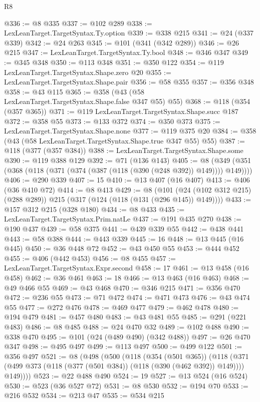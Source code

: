 \begin{lexlean}{R8}
\begin{coremodule}
{{{{{{{{{{{{{{{{{{{{{{{{{{{{{{{{{{{{{{{{{{{{{@336 := @8 @335
@337 := @102 @289
@338 := LexLeanTarget.TargetSyntax.Ty.option
@339 := @338 @215
@341 := @24 (@337 @339)
@342 := @24 @263
@345 := @101 (@341 (@342 @289))
@346 := @26 @215
@347 := LexLeanTarget.TargetSyntax.Ty.bool
@348 := @346 @347
@349 := @345 @348
@350 := @113 @348
@351 := @350 @122
@354 := @119 LexLeanTarget.TargetSyntax.Shape.zero @20
@355 := LexLeanTarget.TargetSyntax.Shape.pair
@356 := @58 @355
@357 := @356 @348
@358 := @43 @115
@365 := @358 (@43 (@58 LexLeanTarget.TargetSyntax.Shape.false @347 @55) @55)
@368 := @118 (@354 (@357 @365))
@371 := @119 LexLeanTarget.TargetSyntax.Shape.succ @187
@372 := @358 @55
@373 := @133 @372
@374 := @350 @373
@375 := LexLeanTarget.TargetSyntax.Shape.none
@377 := @119 @375 @20
@384 := @358 (@43 (@58 LexLeanTarget.TargetSyntax.Shape.true @347 @55) @55)
@387 := @118 (@377 (@357 @384))
@388 := LexLeanTarget.TargetSyntax.Shape.some
@390 := @119 @388 @129
@392 := @71 (@136 @143)
@405 := @8 (@349 (@351 (@368 (@118 (@371 (@374 (@387 (@118 (@390 (@248 @392)) @149)))) @149))))
@406 := @290 @339
@407 := 15
@410 := @13 @407 (@16 @407)
@413 := @406 (@36 @410 @72)
@414 := @8 @413
@429 := @8
    (@101 (@24 (@102 @312 @215) (@288 @289)) @215 (@317 (@124 (@118 (@131 (@296 @145)) @149))))
@433 := @157 @312 @215 (@328 @180)
@434 := @8 @433
@435 := LexLeanTarget.TargetSyntax.Prim.natLe
@437 := @191 @435 @270
@438 := @190 @437
@439 := @58 @375
@441 := @439 @339 @55
@442 := @438 @441
@443 := @58 @388
@444 := @443 @339
@445 := 16
@448 := @13 @445 (@16 @445)
@450 := @36 @448 @72
@452 := @43 @450 @55
@453 := @444 @452
@455 := @406 (@442 @453)
@456 := @8 @455
@457 := LexLeanTarget.TargetSyntax.Expr.second
@458 := 17
@461 := @13 @458 (@16 @458)
@462 := @36 @461
@463 := 18
@466 := @13 @463 (@16 @463)
@468 := @49 @466 @55
@469 := @43 @468
@470 := @346 @215
@471 := @356 @470
@472 := @236 @55
@473 := @71 @472
@474 := @471 @473
@476 := @43 @474 @55
@477 := @272 @476
@478 := @469 @477
@479 := @462 @478
@480 := @194 @479
@481 := @457 @480
@483 := @43 @481 @55
@485 := @291 (@221 @483)
@486 := @8 @485
@488 := @24 @470 @32
@489 := @102 @488
@490 := @338 @470
@495 := @101 (@24 (@489 @490) (@342 @488))
@497 := @26 @470 @347
@498 := @495 @497
@499 := @113 @497
@500 := @499 @122
@501 := @356 @497
@521 := @8
    (@498
      (@500
        (@118
          (@354 (@501 @365))
          (@118 (@371 (@499 @373 (@118 (@377 (@501 @384)) (@118 (@390 (@462 @392)) @149)))) @149))))
@523 := @22 @488 @490
@524 := 19
@527 := @13 @524 (@16 @524)
@530 := @523 (@36 @527 @72)
@531 := @8 @530
@532 := @194 @70
@533 := @216 @532
@534 := @213 @47
@535 := @534 @215
}}}}}}}}}}}}}}}}}}}}}}}}}}}}}}}}}}}}}}}}}}}}}
\end{coremodule}
\end{lexlean}
